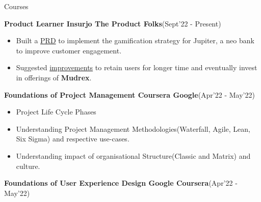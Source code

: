 \documentclass{resume}
\newcommand{\sepval}{-0.5em}
\begin{document}
\begin{rSection}{Courses}
\vspace{-.4cm}
 
\item{\bf Product Learner Insurjo The Product Folks}\hfill{(Sept'22 - Present)}\\
[-0.4cm]

\begin{itemize}[leftmargin=*]

	\itemsep \sepval

	\item Built a \href{https://drive.google.com/file/d/1u6uiQsXEsm6QAMnPC-vQYK94N5bbqwSt/view?usp=share_link}{PRD} to implement the gamification strategy for Jupiter, a neo bank to improve customer engagement.

	\item Suggested \href{https://drive.google.com/file/d/1XgBXYlvwXj22Xdp10PC8FvQQhP0Q3tq4/view?usp=share_link}{improvements} to retain users for longer time and eventually invest in offerings of {\bf Mudrex}.


\end{itemize}

\item{\bf Foundations of Project Management Coursera Google}\hfill{(Apr'22 - May'22)}\\
[-0.4cm]

\begin{itemize}[leftmargin=*]

	\itemsep \sepval

	\item Project Life Cycle Phases
	
	\item Understanding Project Management Methodologies(Waterfall, Agile, Lean, Six Sigma) and respective use-cases.
	
	\item Understanding impact of organisational Structure(Classic and Matrix) and culture.

\end{itemize}

\item{\bf Foundations of User Experience Design Google Coursera}\hfill{(Apr'22 - May'22)}\\
[-0.4cm]


\end{rSection}
\end{document}
